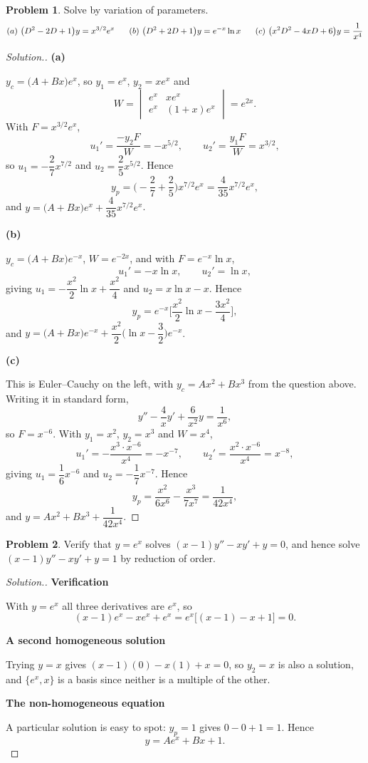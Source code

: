 \documentclass[11pt,a4paper]{article}
\theoremstyle{definition}
\newtheorem{problemx}{Problem}[subsection]
\newenvironment{problem}{\begin{problemx}}{\end{problemx}}
\newenvironment{solution}
  {\renewcommand{\qedsymbol}{}\begin{proof}[\textit{Solution}.]}
  {\end{proof}}
\newcommand{\subhead}[1]{%
  \par\medskip\noindent\textbf{#1}\par\nobreak\smallskip}
\begin{document}
\begin{problem}
Solve by variation of parameters.
$$(a)\ \big(D^2-2D+1\big)y = x^{3/2}e^{x}\hspace{0.6cm}
(b)\ \big(D^2+2D+1\big)y = e^{-x}\ln x\hspace{0.6cm}
(c)\ \big(x^2D^2-4xD+6\big)y = \frac{1}{x^4}$$
\end{problem}
\begin{solution}
\subhead{(a)}
$y_c = \big(A+Bx\big)e^{x}$, so $y_1 = e^x$, $y_2 = xe^x$ and
$$W = \begin{vmatrix} e^x & xe^x\\ e^x & (1+x)e^x\end{vmatrix} = e^{2x}.$$
With $F = x^{3/2}e^x$,
$$u_1' = \frac{-y_2F}{W} = -x^{5/2},\qquad u_2' = \frac{y_1F}{W} = x^{3/2},$$
so $u_1 = -\dfrac{2}{7}x^{7/2}$ and $u_2 = \dfrac{2}{5}x^{5/2}$. Hence
$$y_p = \Big(-\frac27 + \frac25\Big)x^{7/2}e^x = \frac{4}{35}x^{7/2}e^{x},$$
and $y = \big(A+Bx\big)e^{x} + \dfrac{4}{35}x^{7/2}e^{x}$.

\subhead{(b)}
$y_c = \big(A+Bx\big)e^{-x}$, $W = e^{-2x}$, and with $F = e^{-x}\ln x$,
$$u_1' = -x\ln x,\qquad u_2' = \ln x ,$$
giving $u_1 = -\dfrac{x^2}{2}\ln x + \dfrac{x^2}{4}$ and
$u_2 = x\ln x - x$. Hence
$$y_p = e^{-x}\Big[\frac{x^2}{2}\ln x - \frac{3x^2}{4}\Big],$$
and $y = \big(A+Bx\big)e^{-x} + \dfrac{x^2}{2}\Big(\ln x - \dfrac32\Big)e^{-x}$.

\subhead{(c)}
This is Euler--Cauchy on the left, with $y_c = Ax^2+Bx^3$ from the question
above. Writing it in standard form,
$$y'' - \frac4xy' + \frac{6}{x^2}y = \frac{1}{x^6},$$
so $F = x^{-6}$. With $y_1 = x^2$, $y_2 = x^3$ and $W = x^4$,
$$u_1' = -\frac{x^3\cdot x^{-6}}{x^4} = -x^{-7},\qquad
u_2' = \frac{x^2\cdot x^{-6}}{x^4} = x^{-8},$$
giving $u_1 = \dfrac{1}{6}x^{-6}$ and $u_2 = -\dfrac{1}{7}x^{-7}$. Hence
$$y_p = \frac{x^2}{6x^6} - \frac{x^3}{7x^7} = \frac{1}{42x^4},$$
and $y = Ax^2+Bx^3+\dfrac{1}{42x^4}$.
\end{solution}

\begin{problem}
Verify that $y = e^{x}$ solves $(x-1)y''-xy'+y = 0$, and hence solve
$(x-1)y''-xy'+y = 1$ by reduction of order.
\end{problem}
\begin{solution}
\subhead{Verification}
With $y = e^x$ all three derivatives are $e^x$, so
$$(x-1)e^x - xe^x + e^x = e^x\big[(x-1)-x+1\big] = 0 .$$

\subhead{A second homogeneous solution}
Trying $y = x$ gives $(x-1)(0) - x(1) + x = 0$, so $y_2 = x$ is also a solution,
and $\{e^x, x\}$ is a basis since neither is a multiple of the other.

\subhead{The non-homogeneous equation}
A particular solution is easy to spot: $y_p = 1$ gives
$0 - 0 + 1 = 1$. Hence
$$y = Ae^{x} + Bx + 1 .$$
\end{solution}
\end{document}

